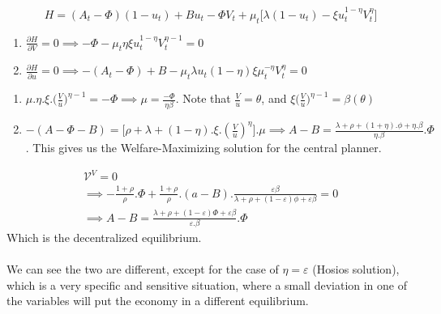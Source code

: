 \begin{equation*}
    H=(A_{t}-\Phi)(1-u_{t})+Bu_{t}-\Phi V_{t}+\mu_{t}\big[\lambda(1-u_{t})-\xi u_{t}^{1-\eta}V_{t}^{\eta} \big]
\end{equation*}

\begin{enumerate}
    \item $\frac{\partial H}{\partial V}= 0 \implies -\Phi-\mu_{t}\eta\xi u_{t}^{1-\eta} V_{t}^{\eta-1}=0$
    \item $\frac{\partial H}{\partial u}=0 \implies -(A_{t}-\Phi)+B-\mu_{t}\lambda u_{t}(1-\eta)\xi\mu_{t}^{-\eta}V_{t}^{\eta}=0$
\end{enumerate}

\begin{enumerate}
    \item $\mu.\eta.\xi.\big(\frac{V}{u}\big)^{\eta-1}=-\Phi \implies \mu=\frac{-\Phi}{\eta\beta}$. Note that $\frac{V}{u}=\theta$, and $\xi\big(\frac{V}{u}\big)^{\eta-1}=\beta(\theta)$ 
    \item $-(A-\Phi-B)=\big[\rho+\lambda+(1-\eta).\xi.(\frac{V}{u})^{\eta} \big].\mu \implies A-B=\frac{\lambda+\rho+(1+\eta).\phi+\eta.\beta}{\eta.\beta}.\Phi$. This gives us the Welfare-Maximizing solution for the central planner.
\end{enumerate}

\begin{equation*}
    \begin{aligned}
        \mathcal{V}^{V}=0 \\ \implies-\frac{1+\rho}{\rho}.\Phi+\frac{1+\rho}{\rho}.(a-B).\frac{\varepsilon\beta}{\lambda+\rho+(1-\varepsilon)\phi+\varepsilon\beta}=0 \\
        \implies A-B=\frac{\lambda+\rho+(1-\varepsilon)\Phi+\varepsilon\beta}{\varepsilon.\beta}.\Phi 
    \end{aligned}
\end{equation*}
Which is the decentralized equilibrium. 
\paragraph{} 
We can see the two are different, except for the case of $\eta=\varepsilon$ (Hosios solution), which is a very specific and sensitive situation, where a small deviation in one of the variables will put the economy in a different equilibrium. 




